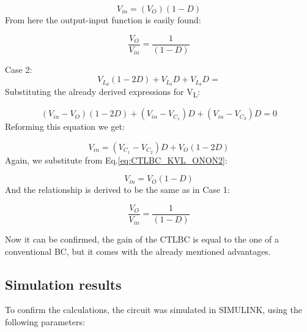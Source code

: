 \begin{equation}
	V_{in}=(V_{O})(1-D)
	\label{eq:CTLBC_IVSB4}
\end{equation}
From here the output-input function is easily found:

\begin{equation}
	\frac{V_O}{V_{in}}=\frac{1}{(1-D)}
	\label{eq:CTLBC_IVSB5}
\end{equation}

Case 2: 
\begin{equation}
	V_{L_d}(1-2D)+V_{L_b}D+V_{L_b}D=
	\label{eq:CTLBC_CASE2}
\end{equation}
Substituting the already derived expressions for V\textsubscript{L}:

\begin{equation}
	(V_{in}-V_O)(1-2D)+(V_{in} - V_{C_1})D+(V_{in} - V_{C_2})D=0
	\label{eq:CTLBC_CASE2_2}
\end{equation}
Reforming this equation we get: 

\begin{equation}
	V_{in}=(V_{C_1} - V_{C_2})D+V_O(1-2D)
	\label{eq:CTLBC_CASE2_3}
\end{equation}
Again, we substitute from Eq.\ref{eq:CTLBC_KVL_ONON2}:

\begin{equation}
	V_{in}=V_{O}(1-D)
	\label{eq:CTLBC_CASE2_4}
\end{equation}
And the relationship is derived to be the same as in Case 1:

\begin{equation}
	\frac{V_O}{V_{in}}=\frac{1}{(1-D)}
	\label{eq:CTLBC_CASE2_5}
\end{equation}

Now it can be confirmed, the gain of the CTLBC is equal to the one of a conventional BC, but it comes with the already mentioned advantages. 

\subsection{Simulation results}

To confirm the calculations, the circuit was simulated in SIMULINK, using the following parameters: 

